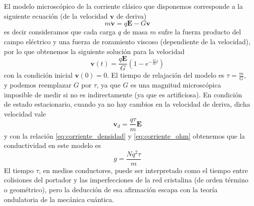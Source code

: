 \documentclass[11pt,a4paper]{article}
\numberwithin{equation}{section}
\begin{document}
El modelo microscópico de la corriente clásico que disponemos corresponde a la siguiente ecuación (de la velocidad $\textbf{v}$ de deriva)
\begin{equation}
    m \dot{\textbf{v}} = q \textbf{E} - G \textbf{v}
    \label{eq:corriente_micro}
\end{equation}
es decir consideramos que cada carga $q$ de masa $m$ sufre la fuerza producto del campo eléctrico y una fuerza de rozamiento viscoso (dependiente de la velocidad), por lo que obtenemos la siguiente solución para la velocidad \[\textbf{v}(t) = \frac{q \textbf{E}}{G} (1 - e^{-\frac{G}{m}t})\] con la condición inicial $\textbf{v}(0) =0$. El tiempo de relajación del modelo es $\tau = \frac{m}{G}$, y podemos reemplazar $G$ por $\tau$, ya que $G$ es una magnitud microscópica imposible de medir si no es indirectamente (ya que es artificiosa). En condición de estado estacionario, cuando ya no hay cambios en la velocidad de deriva, dicha velocidad vale 
\begin{equation}
    \textbf{v}_d = \frac{q \tau}{m} \textbf{E}
    \label{eq:corriente_deriva_micro}
\end{equation}
y con la relación \ref{eq:corriente_densidad} y \ref{eq:corriente_ohm} obtenemos que la conductividad en este modelo es
\begin{equation}
    g = \frac{N q^2 \tau}{m}
    \label{eq:corriente_conductividad_micro}
\end{equation}
El tiempo $\tau$, en medios conductores, puede ser interpretado como el tiempo entre colisiones del portador y las imperfecciones de la red cristalina (de orden término o geométrico), pero la deducción de esa afirmación escapa con la teoría ondulatoria de la mecánica cuántica.
\end{document}
